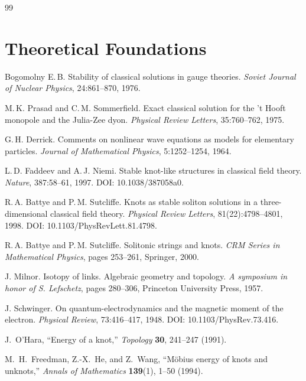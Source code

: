 \documentclass[11pt,a4paper]{article}
\begin{document}
\begin{thebibliography}{99}

\section*{Theoretical Foundations}

Bogomolny E.\,B.
\newblock Stability of classical solutions in gauge theories.
\newblock \textit{Soviet Journal of Nuclear Physics}, 24:861--870, 1976.

M.\,K. Prasad and C.\,M. Sommerfield.
\newblock Exact classical solution for the 't Hooft monopole and the Julia-Zee dyon.
\newblock \textit{Physical Review Letters}, 35:760--762, 1975.

G.\,H. Derrick.
\newblock Comments on nonlinear wave equations as models for elementary particles.
\newblock \textit{Journal of Mathematical Physics}, 5:1252--1254, 1964.

L.\,D. Faddeev and A.\,J. Niemi.
\newblock Stable knot-like structures in classical field theory.
\newblock \textit{Nature}, 387:58--61, 1997.
\newblock DOI: 10.1038/387058a0.

R.\,A. Battye and P.\,M. Sutcliffe.
\newblock Knots as stable soliton solutions in a three-dimensional classical field theory.
\newblock \textit{Physical Review Letters}, 81(22):4798--4801, 1998.
\newblock DOI: 10.1103/PhysRevLett.81.4798.

R.\,A. Battye and P.\,M. Sutcliffe.
\newblock Solitonic strings and knots.
\newblock \textit{CRM Series in Mathematical Physics}, pages 253--261, Springer, 2000.

J. Milnor.
\newblock Isotopy of links. Algebraic geometry and topology.
\newblock \textit{A symposium in honor of S. Lefschetz}, pages 280--306, Princeton University Press, 1957.

J. Schwinger.
\newblock On quantum-electrodynamics and the magnetic moment of the electron.
\newblock \textit{Physical Review}, 73:416--417, 1948.
\newblock DOI: 10.1103/PhysRev.73.416.

 J.~O'Hara, ``Energy of a knot,''
\textit{Topology}
\textbf{30}, 241--247 (1991).

 M.~H.~Freedman, Z.-X.~He, and Z.~Wang, ``Möbius energy of knots and unknots,''
\textit{Annals of Mathematics}
\textbf{139}(1), 1--50 (1994).


\end{thebibliography}
\end{document}
